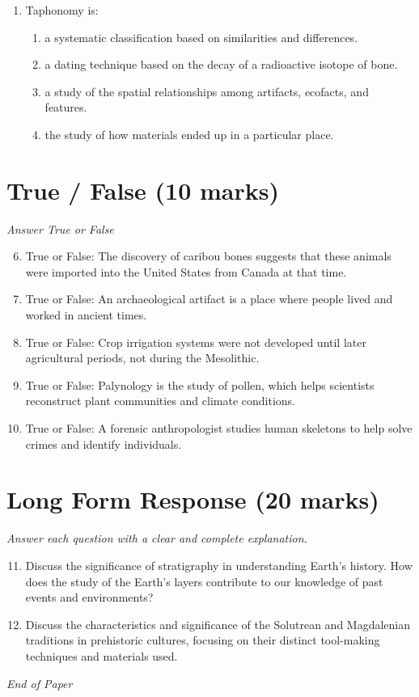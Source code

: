 \documentclass[12pt]{article}
\begin{document}
\begin{enumerate}[label=\arabic*.]
\begin{enumerate}[label=(\alph*)]
    \item The position of the foramen magnum
    \item The absence of a divergent big toe
    \item All the above
\end{enumerate}
\item Taphonomy is:
\begin{enumerate}[label=(\alph*)]
    \item a systematic classification based on similarities and differences.
    \item a dating technique based on the decay of a radioactive isotope of bone.
    \item a study of the spatial relationships among artifacts, ecofacts, and features.
    \item the study of how materials ended up in a particular place.
\end{enumerate}
\end{enumerate}

\section*{True / False (10 marks)}
\textit{Answer True or False}
\begin{enumerate}[label=\arabic*.]
\setcounter{enumi}{5}
\item True or False: The discovery of caribou bones suggests that these animals were imported into the United States from Canada at that time.
\item True or False: An archaeological artifact is a place where people lived and worked in ancient times.
\item True or False: Crop irrigation systems were not developed until later agricultural periods, not during the Mesolithic.
\item True or False: Palynology is the study of pollen, which helps scientists reconstruct plant communities and climate conditions.
\item True or False: A forensic anthropologist studies human skeletons to help solve crimes and identify individuals.
\end{enumerate}

\section*{Long Form Response (20 marks)}
\textit{Answer each question with a clear and complete explanation.}
\begin{enumerate}[label=\arabic*.]
\setcounter{enumi}{10}
\item Discuss the significance of stratigraphy in understanding Earth's history. How does the study of the Earth's layers contribute to our knowledge of past events and environments?
\item Discuss the characteristics and significance of the Solutrean and Magdalenian traditions in prehistoric cultures, focusing on their distinct tool-making techniques and materials used.
\end{enumerate}

\vfill
\noindent\textit{End of Paper}
\end{document}
